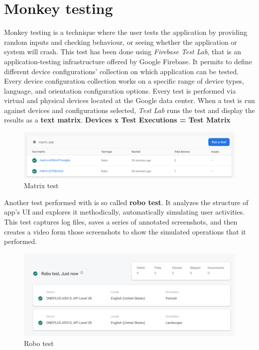 \section{Monkey testing}
Monkey testing is a technique where the user tests the application by providing random inputs and checking behaviour, or seeing whether the application or system will crash.
This test has been done using \textit{Firebase Test Lab}, that is an application-testing infrastructure offered by Google Firebase.
It permits to define different device configurations' collection on which application can be tested. Every device configuration collection works on a specific range of device types, language, and orientation configuration options.
Every test is performed via virtual and physical devices located at the Google data center.
When a test is run against devices and configurations selected, \textit{Test Lab} runs the test and display the results as a \textbf{text matrix}.
\newline
\textbf{Devices x Test Executions = Test Matrix}
\begin{figure}[H]
   \centering
  \centerline{\includegraphics[width=150mm,scale=0.9]{./Images/testing/testing1.png}}
  \caption{Matrix test}
\end{figure}

Another test performed with  is so called \textbf{robo test}.
It analyzes the structure of app's UI and explores it methodically, automatically simulating user activities.
This test captures log files, saves a series of annotated screenshots, and then creates a video form those screenshots to show the simulated operations that it performed.
\begin{figure}[H]
   \centering
  \centerline{\includegraphics[width=150mm,scale=0.9]{./Images/testing/testing2.png}}
  \caption{Robo test}
\end{figure}
